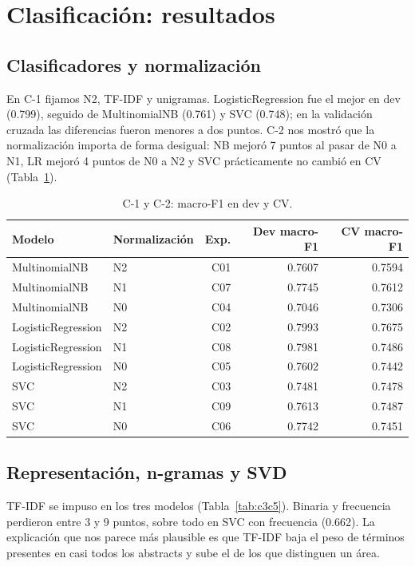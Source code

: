 \documentclass[11pt,a4paper]{article}
\begin{document}
\section{Clasificación: resultados}

\subsection{Clasificadores y normalización}
En C-1 fijamos N2, TF-IDF y unigramas. LogisticRegression fue el mejor en dev
(0.799), seguido de MultinomialNB (0.761) y SVC (0.748); en la validación cruzada las
diferencias fueron menores a dos puntos. C-2 nos mostró que la normalización importa
de forma desigual: NB mejoró 7 puntos al pasar de N0 a N1, LR mejoró 4 puntos de N0 a N2 y
SVC prácticamente no cambió en CV (Tabla~\ref{tab:c1c2}).

\begin{table}[htbp]
\centering
\small
\caption{C-1 y C-2: macro-F1 en dev y CV.}
\label{tab:c1c2}
\begin{tabular}{@{}llrrr@{}}
\toprule
Modelo & Normalización & Exp. & Dev macro-F1 & CV macro-F1\\
\midrule
MultinomialNB & N2 & C01 & 0.7607 & 0.7594\\
MultinomialNB & N1 & C07 & 0.7745 & 0.7612\\
MultinomialNB & N0 & C04 & 0.7046 & 0.7306\\
\midrule
LogisticRegression & N2 & C02 & 0.7993 & 0.7675\\
LogisticRegression & N1 & C08 & 0.7981 & 0.7486\\
LogisticRegression & N0 & C05 & 0.7602 & 0.7442\\
\midrule
SVC & N2 & C03 & 0.7481 & 0.7478\\
SVC & N1 & C09 & 0.7613 & 0.7487\\
SVC & N0 & C06 & 0.7742 & 0.7451\\
\bottomrule
\end{tabular}
\end{table}

\subsection{Representación, n-gramas y SVD}
TF-IDF se impuso en los tres modelos (Tabla~\ref{tab:c3c5}). Binaria y frecuencia
perdieron entre 3 y 9 puntos, sobre todo en SVC con frecuencia (0.662). La explicación que
nos parece más plausible es que TF-IDF baja el peso de términos presentes en casi todos
los abstracts y sube el de los que distinguen un área.
\end{document}
